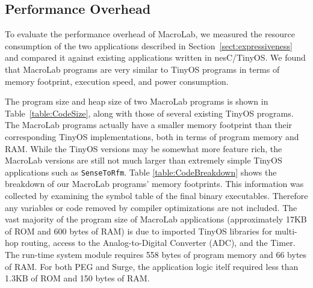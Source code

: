 \subsection{Performance Overhead} \label{sec:performance}

To evaluate the performance overhead of MacroLab, we measured the
resource consumption of the two applications described in
Section~\ref{sect:expressiveness} and compared it against existing
applications written in nesC/TinyOS.  We found that MacroLab programs
are very similar to TinyOS programs in terms of memory footprint,
execution speed, and power consumption.

The program size and heap size of two MacroLab programs is shown in
Table~\ref{table:CodeSize}, along with those of several existing TinyOS
programs.  The MacroLab programs actually have a smaller memory footprint than
their corresponding TinyOS implementations, both in terms of program memory and
RAM. While the TinyOS versions may be somewhat more feature rich, the MacroLab
versions are still not much larger than extremely simple TinyOS applications
such as {\tt SenseToRfm}.  Table \ref{table:CodeBreakdown} shows the breakdown
of our MacroLab programs' memory footprints.  This information was collected by
examining the symbol table of the final binary executables.  Therefore any
variables or code removed by compiler optimizations are not included. The vast
majority of the program size of MacroLab applications (approximately 17KB of ROM
and 600 bytes of RAM) is due to imported TinyOS libraries for multi-hop routing,
access to the Analog-to-Digital Converter (ADC), and the Timer.  The run-time
system module requires 558 bytes of program memory and 66 bytes of RAM.  For
both PEG and Surge, the application logic itelf required less than 1.3KB of ROM
and 150 bytes of RAM.


